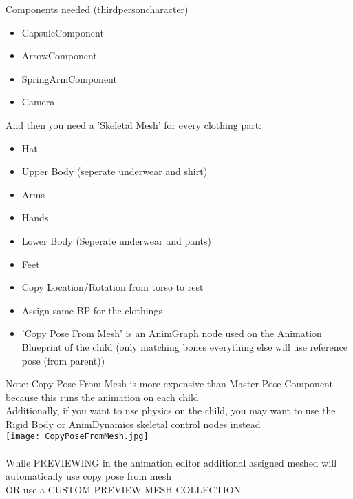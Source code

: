 \documentclass{scrbook}
\begin{document}
                \underline{Components needed} (thirdpersoncharacter)
                \begin{itemize}
                    \item CapsuleComponent
                    \item ArrowComponent
                    \item SpringArmComponent
                    \item Camera
                \end{itemize}
\smallskip            
                And then you need a 'Skeletal Mesh' for every clothing part:
                \begin{itemize}
                    \item Hat
                    \item Upper Body (seperate underwear and shirt)
                    \item Arms
                    \item Hands
                    \item Lower Body (Seperate underwear and pants)
                    \item Feet
                \end{itemize}
\smallskip 
                \begin{itemize}
                    \item Copy Location/Rotation from torso to rest
                    \item Assign same BP for the clothings
                    \item 'Copy Pose From Mesh' is an AnimGraph node used on the Animation Blueprint of the child (only matching bones everything else will use reference pose (from parent))
                \end{itemize}
\smallskip
                Note: Copy Pose From Mesh is more expensive than Master Pose Component because this runs the animation on each child \\
                Additionally, if you want to use physics on the child, you may want to use the Rigid Body  or AnimDynamics  skeletal control nodes instead \\
                \texttt{[image: CopyPoseFromMesh.jpg]} \\
\smallskip \\
                While PREVIEWING in the animation editor additional assigned meshed will automatically use copy pose from mesh \\
                OR use a CUSTOM PREVIEW MESH COLLECTION \\
\end{document}
